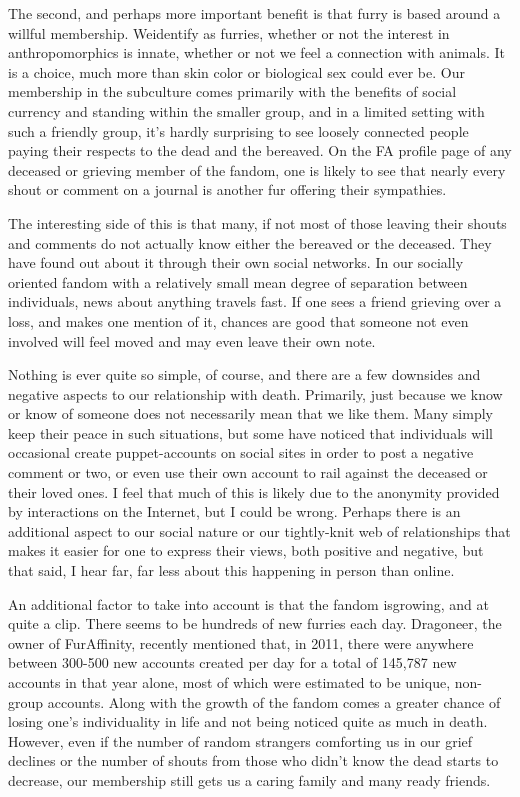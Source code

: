 The second, and perhaps more important benefit is that furry is based around a willful membership. Weidentify as furries, whether or not the interest in anthropomorphics is innate, whether or not we feel a connection with animals. It is a choice, much more than skin color or biological sex could ever be. Our membership in the subculture comes primarily with the benefits of social currency and standing within the smaller group, and in a limited setting with such a friendly group, it's hardly surprising to see loosely connected people paying their respects to the dead and the bereaved. On the FA profile page of any deceased or grieving member of the fandom, one is likely to see that nearly every shout or comment on a journal is another fur offering their sympathies.

The interesting side of this is that many, if not most of those leaving their shouts and comments do not actually know either the bereaved or the deceased.  They have found out about it through their own social networks. In our socially oriented fandom with a relatively small mean degree of separation between individuals, news about anything travels fast. If one sees a friend grieving over a loss, and makes one mention of it, chances are good that someone not even involved will feel moved and may even leave their own note.

Nothing is ever quite so simple, of course, and there are a few downsides and negative aspects to our relationship with death. Primarily, just because we know or know of someone does not necessarily mean that we like them. Many simply keep their peace in such situations, but some have noticed that individuals will occasional create puppet-accounts on social sites in order to post a negative comment or two, or even use their own account to rail against the deceased or their loved ones. I feel that much of this is likely due to the anonymity provided by interactions on the Internet, but I could be wrong. Perhaps there is an additional aspect to our social nature or our tightly-knit web of relationships that makes it easier for one to express their views, both positive and negative, but that said, I hear far, far less about this happening in person than online.

An additional factor to take into account is that the fandom isgrowing, and at quite a clip. There seems to be hundreds of new furries each day. Dragoneer, the owner of FurAffinity, recently mentioned that, in 2011, there were anywhere between 300-500 new accounts created per day for a total of 145,787 new accounts in that year alone, most of which were estimated to be unique, non-group accounts. Along with the growth of the fandom comes a greater chance of losing one's individuality in life and not being noticed quite as much in death. However, even if the number of random strangers comforting us in our grief declines or the number of shouts from those who didn't know the dead starts to decrease, our membership still gets us a caring family and many ready friends.

